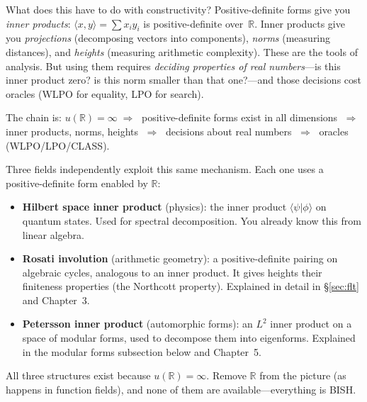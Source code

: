 \documentclass[11pt,twoside,openany]{report}
\theoremstyle{remark}
\newcommand{\BISH}{\textsf{BISH}}
\newcommand{\WLPO}{\textsf{WLPO}}
\newcommand{\LPO}{\textsf{LPO}}
\newcommand{\CLASS}{\textsf{CLASS}}
\begin{document}
What does this have to do with constructivity? Positive-definite forms give you \emph{inner products}: $\langle x, y \rangle = \sum x_i y_i$ is positive-definite over~$\mathbb{R}$. Inner products give you \emph{projections} (decomposing vectors into components), \emph{norms} (measuring distances), and \emph{heights} (measuring arithmetic complexity). These are the tools of analysis. But using them requires \emph{deciding properties of real numbers}---is this inner product zero? is this norm smaller than that one?---and those decisions cost oracles (\WLPO{} for equality, \LPO{} for search).

The chain is: $u(\mathbb{R}) = \infty \;\Rightarrow\;$ positive-definite forms exist in all dimensions $\;\Rightarrow\;$ inner products, norms, heights $\;\Rightarrow\;$ decisions about real numbers $\;\Rightarrow\;$ oracles (\WLPO/\LPO/\CLASS).

Three fields independently exploit this same mechanism. Each one uses a positive-definite form enabled by $\mathbb{R}$:
\begin{itemize}
  \item \textbf{Hilbert space inner product} (physics): the inner product $\langle \psi | \phi \rangle$ on quantum states. Used for spectral decomposition. You already know this from linear algebra.
  \item \textbf{Rosati involution} (arithmetic geometry): a positive-definite pairing on algebraic cycles, analogous to an inner product. It gives heights their finiteness properties (the Northcott property). Explained in detail in \S\ref{sec:flt} and Chapter~3.
  \item \textbf{Petersson inner product} (automorphic forms): an $L^2$ inner product on a space of modular forms, used to decompose them into eigenforms. Explained in the modular forms subsection below and Chapter~5.
\end{itemize}

\noindent All three structures exist because $u(\mathbb{R}) = \infty$. Remove $\mathbb{R}$ from the picture (as happens in function fields), and none of them are available---everything is \BISH.
\end{document}
